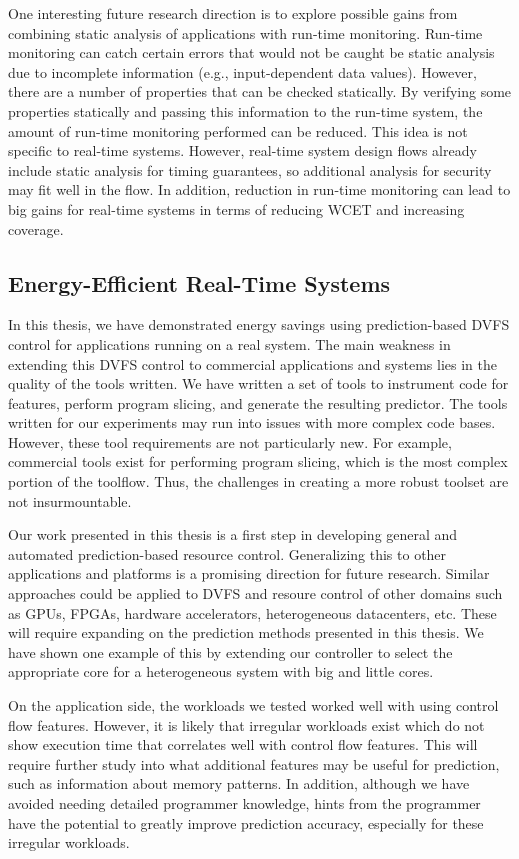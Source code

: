 One interesting future research direction is to explore possible gains from
combining static analysis of applications with run-time monitoring. Run-time
monitoring can catch certain errors that would not be caught be static analysis
due to incomplete information (e.g., input-dependent data values). However,
there are a number of properties that can be checked statically. 
By verifying some properties statically and passing this information to the
run-time system, the amount of run-time monitoring performed can be reduced.
This idea is not specific to real-time systems. However, real-time system
design flows already include static analysis for timing guarantees, so
additional analysis for security may fit well in the flow. In addition,
reduction in run-time monitoring can lead to big gains for real-time systems in
terms of reducing WCET and increasing coverage.

\subsection{Energy-Efficient Real-Time Systems}

In this thesis, we have demonstrated energy savings using prediction-based DVFS
control for applications running on a real system.  The main weakness in
extending this DVFS control to commercial applications and systems lies in the
quality of the tools written. We have written a set of tools to instrument code
for features, perform program slicing, and generate the resulting predictor.
The tools written for our experiments may run into issues with more complex
code bases. However, these tool requirements are not particularly new. For
example, commercial tools exist for performing program slicing, which is the
most complex portion of the toolflow. Thus, the challenges in creating a more
robust toolset are not insurmountable. 

Our work presented in this thesis is a first step in developing general and
automated prediction-based resource control. Generalizing this to other
applications and platforms is a promising direction for future research.
Similar approaches could be applied to DVFS and resoure control of other
domains such as GPUs, FPGAs, hardware accelerators, heterogeneous datacenters,
etc. These will require expanding on the prediction methods presented in this
thesis. We have shown one example of this by extending our controller to select
the appropriate core for a heterogeneous system with big and little cores.

On the application side, the workloads we tested worked well with using control
flow features. However, it is likely that irregular workloads exist which do
not show execution time that correlates well with control flow features. This
will require further study into what additional features may be useful for
prediction, such as information about memory patterns. In addition, although we
have avoided needing detailed programmer knowledge, hints from the programmer
have the potential to greatly improve prediction accuracy, especially for
these irregular workloads.

